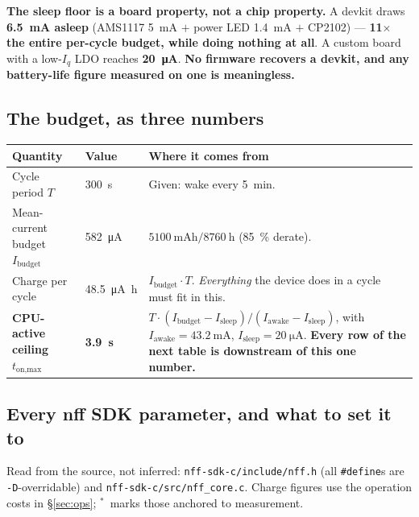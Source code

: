 \documentclass[10pt,a4paper]{article}
\newcommand{\good}[1]{\textcolor{ok}{\textbf{#1}}}
\newcommand{\bad}[1]{\textcolor{warn}{\textbf{#1}}}
\newcommand{\meas}{\textcolor{ok}{$^{\ast}$}}
\begin{document}
\medskip
\noindent
\textbf{The sleep floor is a board property, not a chip property.} A devkit draws
\bad{\SI{6.5}{\milli\ampere} asleep} (AMS1117 \SI{5}{\milli\ampere} $+$ power LED
\SI{1.4}{\milli\ampere} $+$ CP2102) --- \bad{\num{11}$\times$ the entire per-cycle budget, while
doing nothing at all}. A custom board with a low-$I_q$ LDO reaches \good{\SI{20}{\micro\ampere}}.
\textbf{No firmware recovers a devkit, and any battery-life figure measured on one is meaningless.}

\subsection*{The budget, as three numbers}

\begin{center}
\begin{tabularx}{\textwidth}{llX}
\toprule
\textbf{Quantity} & \textbf{Value} & \textbf{Where it comes from} \\
\midrule
Cycle period $T$          & \SI{300}{\second}        & Given: wake every \SI{5}{\minute}. \\
Mean-current budget $I_\text{budget}$ & \SI{582}{\micro\ampere} & $\SI{5100}{\milli\ampere\hour}/\SI{8760}{\hour}$ (\SI{85}{\percent} derate). \\
Charge per cycle          & \SI{48.5}{\micro\ampere\hour} & $I_\text{budget}\cdot T$. \emph{Everything} the device does in a cycle must fit in this. \\
\midrule
\textbf{CPU-active ceiling $t_\text{on,max}$} & \bad{\textbf{\SI{3.9}{\second}}} &
$T\cdot(I_\text{budget}-I_\text{sleep})/(I_\text{awake}-I_\text{sleep})$, with
$I_\text{awake}=\SI{43.2}{\milli\ampere}$, $I_\text{sleep}=\SI{20}{\micro\ampere}$.
\textbf{Every row of the next table is downstream of this one number.} \\
\bottomrule
\end{tabularx}
\end{center}

\subsection*{Every nff SDK parameter, and what to set it to}

Read from the source, not inferred: \texttt{nff-sdk-c/include/nff.h} (all
\texttt{\#define}s are \texttt{-D}-overridable) and \texttt{nff-sdk-c/src/nff\_core.c}.
Charge figures use the operation costs in \S\ref{sec:ops}; \meas\ marks those anchored to
measurement.
\end{document}
